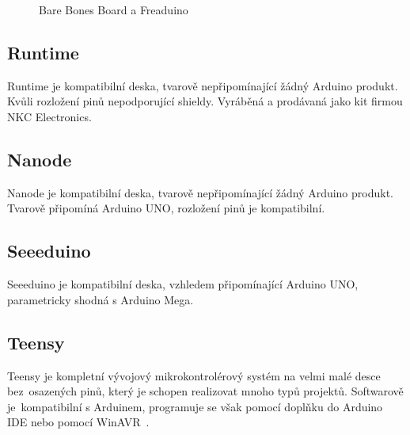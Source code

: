 	\begin{figure}[!ht]
	\vspace{-10pt}	
    \centering
			\hspace*{5mm}
					\caption{Bare Bones Board a Freaduino}
					\vspace{-20pt}	
	\end{figure}	
	
	\subsection{Runtime} 
	Runtime je kompatibilní deska, tvarově nepřipomínající žádný Arduino produkt. Kvůli rozložení pinů nepodporující shieldy. Vyráběná a prodávaná jako kit firmou NKC Electronics.
	
	\subsection{Nanode} 
	Nanode je kompatibilní deska, tvarově nepřipomínající žádný Arduino produkt. Tvarově připomíná Arduino UNO, rozložení pinů je kompatibilní.
	
	\subsection{Seeeduino} 
	Seeeduino je kompatibilní deska, vzhledem připomínající Arduino UNO, parametricky shodná s Arduino Mega.
	
	\subsection{Teensy}
	Teensy je kompletní vývojový mikrokontrolérový systém na velmi malé desce bez~osazených pinů, který je schopen realizovat mnoho typů projektů. Softwarově je~kompatibilní s Arduinem, programuje se však pomocí doplňku do Arduino IDE nebo pomocí WinAVR~\cite{ArduinoTeensy}.
	
